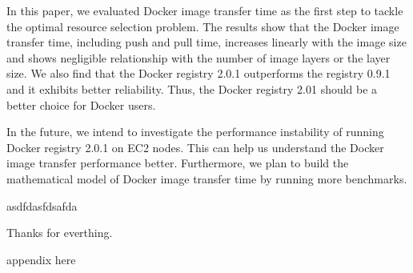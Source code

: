 \documentclass{ieicej}
\begin{document}
In this paper, we evaluated Docker image transfer time as the first step to tackle the optimal resource selection problem. The results show that the Docker image transfer time, including push and pull time, increases linearly with the image size and shows negligible relationship with the number of image layers or the layer size. We also find that the Docker registry 2.0.1 outperforms the registry 0.9.1 and it exhibits better reliability. Thus, the Docker registry 2.01 should be a better choice for Docker users.


In the future, we intend to investigate the performance instability of running Docker registry 2.0.1 on EC2 nodes. This can help us understand the Docker image transfer performance better. Furthermore, we plan to build the mathematical model of Docker image transfer time by running more benchmarks.

asdfdasfdsafda \cite{felter2014updated}


\ack %
Thanks for everthing.




\appendix
appendix here

\end{document}
